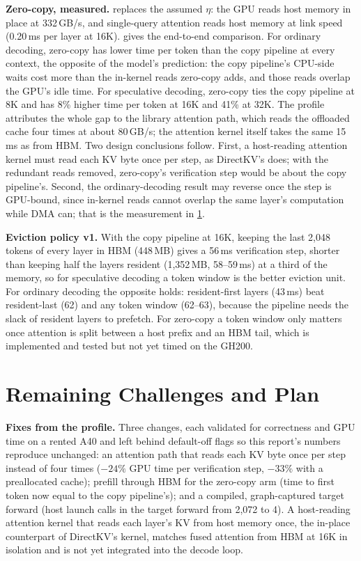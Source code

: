 \documentclass{article}
\begin{document}
\textbf{Zero-copy, measured.}  replaces the assumed $\eta$: the GPU reads host memory in place at 332\,GB/s, and single-query attention reads host memory at link speed (0.20\,ms per layer at 16K).  gives the end-to-end comparison. For ordinary decoding, zero-copy has lower time per token than the copy pipeline at every context, the opposite of the model's prediction: the copy pipeline's CPU-side waits cost more than the in-kernel reads zero-copy adds, and those reads overlap the GPU's idle time. For speculative decoding, zero-copy ties the copy pipeline at 8K and has 8\% higher time per token at 16K and 41\% at 32K. The profile attributes the whole gap to the library attention path, which reads the offloaded cache four times at about 80\,GB/s; the attention kernel itself takes the same 15\,ms as from HBM. Two design conclusions follow. First, a host-reading attention kernel must read each KV byte once per step, as DirectKV's does; with the redundant reads removed, zero-copy's verification step would be about the copy pipeline's. Second, the ordinary-decoding result may reverse once the step is GPU-bound, since in-kernel reads cannot overlap the same layer's computation while DMA can; that is the measurement in \cref{sec:plan}.

\textbf{Eviction policy v1.} With the copy pipeline at 16K, keeping the last 2{,}048 tokens of every layer in HBM (448\,MB) gives a 56\,ms verification step, shorter than keeping half the layers resident (1{,}352\,MB, 58--59\,ms) at a third of the memory, so for speculative decoding a token window is the better eviction unit. For ordinary decoding the opposite holds: resident-first layers (43\,ms) beat resident-last (62) and any token window (62--63), because the pipeline needs the slack of resident layers to prefetch. For zero-copy a token window only matters once attention is split between a host prefix and an HBM tail, which is implemented and tested but not yet timed on the GH200.

\section{Remaining Challenges and Plan}
\label{sec:plan}

\textbf{Fixes from the profile.} Three changes, each validated for correctness and GPU time on a rented A40 and left behind default-off flags so this report's numbers reproduce unchanged: an attention path that reads each KV byte once per step instead of four times ($-24\%$ GPU time per verification step, $-33\%$ with a preallocated cache); prefill through HBM for the zero-copy arm (time to first token now equal to the copy pipeline's); and a compiled, graph-captured target forward (host launch calls in the target forward from 2{,}072 to 4). A host-reading attention kernel that reads each layer's KV from host memory once, the in-place counterpart of DirectKV's kernel, matches fused attention from HBM at 16K in isolation and is not yet integrated into the decode loop.
\end{document}
